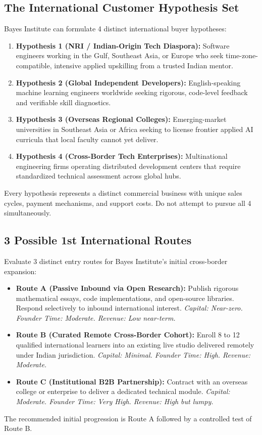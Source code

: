 \subsection{The International Customer Hypothesis Set}
\label{sec:international_customer_hypotheses}

Bayes Institute can formulate 4 distinct international buyer hypotheses:
\begin{enumerate}
\item \textbf{Hypothesis 1 (NRI / Indian-Origin Tech Diaspora):} Software engineers working in the Gulf, Southeast Asia, or Europe who seek time-zone-compatible, intensive applied upskilling from a trusted Indian mentor.
\item \textbf{Hypothesis 2 (Global Independent Developers):} English-speaking machine learning engineers worldwide seeking rigorous, code-level feedback and verifiable skill diagnostics.
\item \textbf{Hypothesis 3 (Overseas Regional Colleges):} Emerging-market universities in Southeast Asia or Africa seeking to license frontier applied AI curricula that local faculty cannot yet deliver.
\item \textbf{Hypothesis 4 (Cross-Border Tech Enterprises):} Multinational engineering firms operating distributed development centers that require standardized technical assessment across global hubs.
\end{enumerate}
Every hypothesis represents a distinct commercial business with unique sales cycles, payment mechanisms, and support costs. Do not attempt to pursue all 4 simultaneously.

\subsection{3 Possible 1st International Routes}
\label{sec:three_first_international_routes}

Evaluate 3 distinct entry routes for Bayes Institute's initial cross-border expansion:
\begin{itemize}
\item \textbf{Route A (Passive Inbound via Open Research):} Publish rigorous mathematical essays, code implementations, and open-source libraries. Respond selectively to inbound international interest. \textit{Capital: Near-zero. Founder Time: Moderate. Revenue: Low near-term.}
\item \textbf{Route B (Curated Remote Cross-Border Cohort):} Enroll 8 to 12 qualified international learners into an existing live studio delivered remotely under Indian jurisdiction. \textit{Capital: Minimal. Founder Time: High. Revenue: Moderate.}
\item \textbf{Route C (Institutional B2B Partnership):} Contract with an overseas college or enterprise to deliver a dedicated technical module. \textit{Capital: Moderate. Founder Time: Very High. Revenue: High but lumpy.}
\end{itemize}
The recommended initial progression is Route A followed by a controlled test of Route B.

